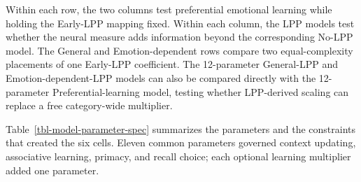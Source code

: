 \documentclass[
  man,
  longtable,
  nolmodern,
  notxfonts,
  notimes,
  draftfirst,
  colorlinks=true,linkcolor=blue,citecolor=blue,urlcolor=blue]{apa7}
\begin{document}
Within each row, the two columns test preferential emotional learning
while holding the Early-LPP mapping fixed. Within each column, the LPP
models test whether the neural measure adds information beyond the
corresponding No-LPP model. The General and Emotion-dependent rows
compare two equal-complexity placements of one Early-LPP coefficient.
The 12-parameter General-LPP and Emotion-dependent-LPP models can also
be compared directly with the 12-parameter Preferential-learning model,
testing whether LPP-derived scaling can replace a free category-wide
multiplier.

Table~\ref{tbl-model-parameter-spec} summarizes the parameters and the
constraints that created the six cells. Eleven common parameters
governed context updating, associative learning, primacy, and recall
choice; each optional learning multiplier added one parameter.
\end{document}
